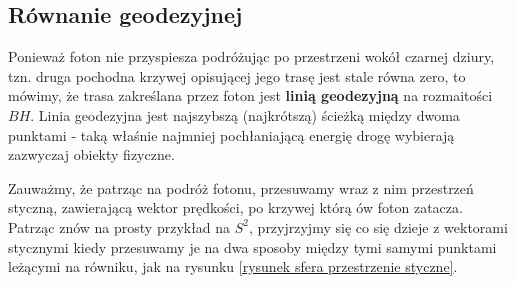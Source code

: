 \subsection{Równanie geodezyjnej} %

%

Ponieważ foton nie przyspiesza podróżując po przestrzeni wokół czarnej dziury, tzn. druga pochodna krzywej opisującej jego trasę jest stale równa zero, to mówimy, że trasa zakreślana przez foton jest \textbf{linią geodezyjną} na rozmaitości $BH$. Linia geodezyjna jest najszybszą (najkrótszą) ścieżką między dwoma punktami - taką właśnie najmniej pochłaniającą energię drogę wybierają zazwyczaj obiekty fizyczne.

Zauważmy, że patrząc na podróż fotonu, przesuwamy wraz z nim przestrzeń styczną, zawierającą wektor prędkości, po krzywej którą ów foton zatacza. Patrząc znów na prosty przykład na $S^2$, przyjrzyjmy się co się dzieje z wektorami stycznymi kiedy przesuwamy je na dwa sposoby między tymi samymi punktami leżącymi na równiku, jak na rysunku \ref{rysunek sfera przestrzenie styczne}.

